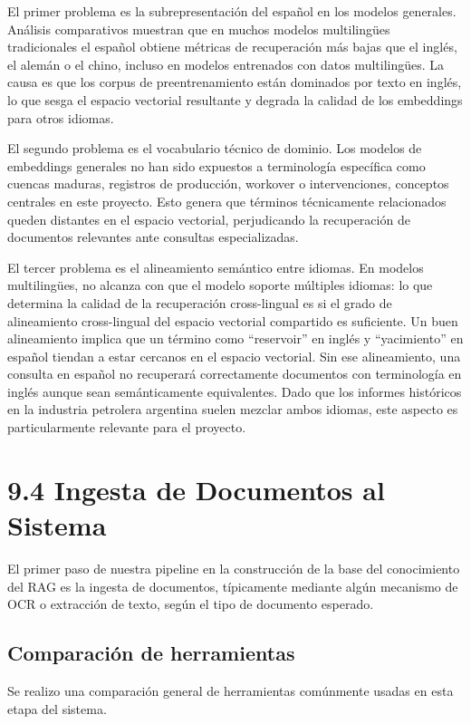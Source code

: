 \documentclass[12pt, a4paper]{report}
\begin{document}
El primer problema es la subrepresentación del español en los modelos generales. Análisis comparativos muestran que en muchos modelos multilingües tradicionales el español obtiene métricas de recuperación más bajas que el inglés, el alemán o el chino, incluso en modelos entrenados con datos multilingües. La causa es que los corpus de preentrenamiento están dominados por texto en inglés, lo que sesga el espacio vectorial resultante y degrada la calidad de los embeddings para otros idiomas.

El segundo problema es el vocabulario técnico de dominio. Los modelos de embeddings generales no han sido expuestos a terminología específica como cuencas maduras, registros de producción, workover o intervenciones, conceptos centrales en este proyecto. Esto genera que términos técnicamente relacionados queden distantes en el espacio vectorial, perjudicando la recuperación de documentos relevantes ante consultas especializadas.

El tercer problema es el alineamiento semántico entre idiomas. En modelos multilingües, no alcanza con que el modelo soporte múltiples idiomas: lo que determina la calidad de la recuperación cross-lingual es si el grado de alineamiento cross-lingual del espacio vectorial compartido es suficiente. Un buen alineamiento implica que un término como ``reservoir'' en inglés y ``yacimiento'' en español tiendan a estar cercanos en el espacio vectorial. Sin ese alineamiento, una consulta en español no recuperará correctamente documentos con terminología en inglés aunque sean semánticamente equivalentes. Dado que los informes históricos en la industria petrolera argentina suelen mezclar ambos idiomas, este aspecto es particularmente relevante para el proyecto.

\section*{9.4 Ingesta de Documentos al Sistema}

El primer paso de nuestra pipeline en la construcción de la base del conocimiento del RAG es la ingesta de documentos, típicamente mediante algún mecanismo de OCR o extracción de texto, según el tipo de documento esperado.

\subsection*{Comparación de herramientas}
Se realizo una comparación general de herramientas comúnmente usadas en esta etapa del sistema.
\end{document}
